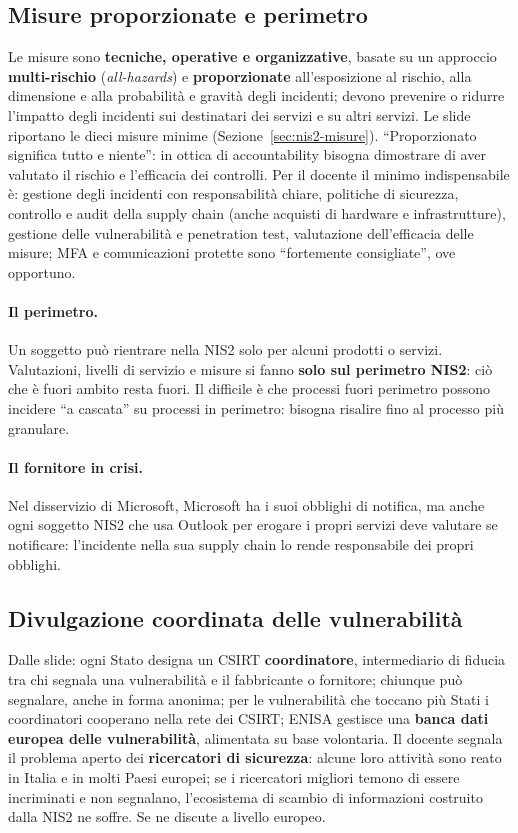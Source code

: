 \subsection{Misure proporzionate e perimetro}
Le misure sono \textbf{tecniche, operative e organizzative}, basate su un approccio
\textbf{multi-rischio} (\emph{all-hazards}) e \textbf{proporzionate} all'esposizione al rischio, alla
dimensione e alla probabilità e gravità degli incidenti; devono prevenire o ridurre l'impatto degli
incidenti sui destinatari dei servizi e su altri servizi. Le slide riportano le dieci misure minime
(Sezione~\ref{sec:nis2-misure}). ``Proporzionato significa tutto e niente'': in ottica di
accountability bisogna dimostrare di aver valutato il rischio e l'efficacia dei controlli. Per il
docente il minimo indispensabile è: gestione degli incidenti con responsabilità chiare, politiche di
sicurezza, controllo e audit della supply chain (anche acquisti di hardware e infrastrutture), gestione
delle vulnerabilità e penetration test, valutazione dell'efficacia delle misure; MFA e comunicazioni
protette sono ``fortemente consigliate'', ove opportuno.

\paragraph{Il perimetro.} Un soggetto può rientrare nella NIS2 solo per alcuni prodotti o servizi.
Valutazioni, livelli di servizio e misure si fanno \textbf{solo sul perimetro NIS2}: ciò che è fuori
ambito resta fuori. Il difficile è che processi fuori perimetro possono incidere ``a cascata'' su
processi in perimetro: bisogna risalire fino al processo più granulare.

\paragraph{Il fornitore in crisi.} Nel disservizio di Microsoft, Microsoft ha i suoi obblighi di
notifica, ma anche ogni soggetto NIS2 che usa Outlook per erogare i propri servizi deve valutare se
notificare: l'incidente nella sua supply chain lo rende responsabile dei propri obblighi.

\subsection{Divulgazione coordinata delle vulnerabilità}
Dalle slide: ogni Stato designa un CSIRT \textbf{coordinatore}, intermediario di fiducia tra chi segnala
una vulnerabilità e il fabbricante o fornitore; chiunque può segnalare, anche in forma anonima;
per le vulnerabilità che toccano più Stati i coordinatori cooperano nella rete dei CSIRT; ENISA
gestisce una \textbf{banca dati europea delle vulnerabilità}, alimentata su base volontaria. Il docente
segnala il problema aperto dei \textbf{ricercatori di sicurezza}: alcune loro attività sono reato in
Italia e in molti Paesi europei; se i ricercatori migliori temono di essere incriminati e non
segnalano, l'ecosistema di scambio di informazioni costruito dalla NIS2 ne soffre. Se ne discute a
livello europeo.

